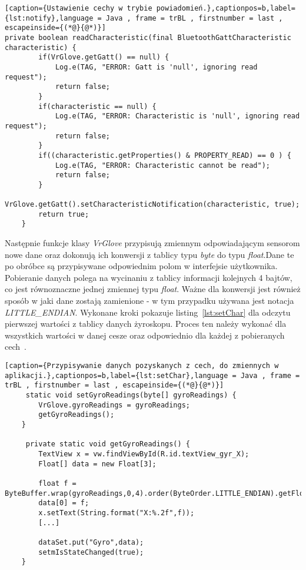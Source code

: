 \begin{lstlisting}[caption={Ustawienie cechy w trybie powiadomień.},captionpos=b,label={lst:notify},language = Java , frame = trBL , firstnumber = last , escapeinside={(*@}{@*)}]     
private boolean readCharacteristic(final BluetoothGattCharacteristic characteristic) {  
        if(VrGlove.getGatt() == null) {
            Log.e(TAG, "ERROR: Gatt is 'null', ignoring read request");
            return false;
        }
        if(characteristic == null) {
            Log.e(TAG, "ERROR: Characteristic is 'null', ignoring read request");
            return false;
        }
        if((characteristic.getProperties() & PROPERTY_READ) == 0 ) {
            Log.e(TAG, "ERROR: Characteristic cannot be read");
            return false;
        }
        VrGlove.getGatt().setCharacteristicNotification(characteristic, true);
        return true;
    }                                                      
\end{lstlisting}
Następnie funkcje klasy \textit{VrGlove} przypisują zmiennym odpowiadającym sensorom nowe dane oraz dokonują ich konwersji z tablicy typu \textit{byte} do typu \textit{float}.Dane te po obróbce są przypisywane odpowiednim polom w interfejsie użytkownika. Pobieranie danych polega na wycinaniu z tablicy informacji kolejnych 4 bajtów, co jest równoznaczne jednej zmiennej typu \textit{float}. Ważne dla konwersji jest również sposób w jaki dane zostają zamienione - w tym przypadku używana jest notacja \textit{LITTLE\_ENDIAN}. Wykonane kroki pokazuje listing~\ref{lst:setChar} dla odczytu pierwszej wartości z tablicy danych żyroskopu. Proces ten należy wykonać dla wszystkich wartości w danej cesze oraz odpowiednio dla każdej z pobieranych cech~\cite{AndroidDoc}.
\begin{lstlisting}[caption={Przypisywanie danych pozyskanych z cech, do zmiennych w aplikacji.},captionpos=b,label={lst:setChar},language = Java , frame = trBL , firstnumber = last , escapeinside={(*@}{@*)}]     
     static void setGyroReadings(byte[] gyroReadings) {
        VrGlove.gyroReadings = gyroReadings;
        getGyroReadings();
    }      
    
     private static void getGyroReadings() {
        TextView x = vw.findViewById(R.id.textView_gyr_X);
        Float[] data = new Float[3];
        
        float f = ByteBuffer.wrap(gyroReadings,0,4).order(ByteOrder.LITTLE_ENDIAN).getFloat();
        data[0] = f;
        x.setText(String.format("X:%.2f",f));
      	[...]

        dataSet.put("Gyro",data);
        setmIsStateChanged(true);
    }                                      
\end{lstlisting}

